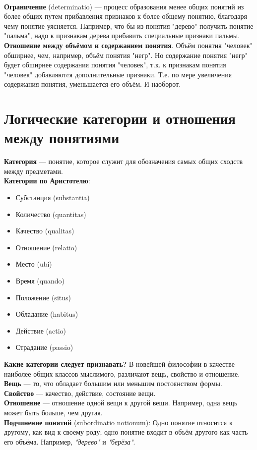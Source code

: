 \documentclass{article}
\begin{document}
\\
\textbf{Ограничение} (determinatio) --- процесс образования менее общих понятий из более общих путем прибавления признаков к более общему понятию, благодаря чему понятие уясняется. Например, что бы из понятия "дерево" получить понятие "пальма", надо к признакам дерева прибавить специальные признаки пальмы.
\\
\textbf{Отношение между объёмом и содержанием понятия}. Объём понятия "человек" обширнее, чем, например, объём понятия "негр". Но содержание понятия "негр" будет обширнее содержания понятия "человек", т.к. к признакам понятия "человек" добавляютcя дополнительные признаки. Т.е. по мере увеличения содержания понятия, уменьшается его объём. И наоборот.

\section{Логические категории и отношения между понятиями}
\textbf{Категория} --- понятие, которое служит для обозначения самых общих сходств между предметами.
\\
\textbf{Категории по Аристотелю}:
\begin{itemize}
\item Субстанция (substantia)
\item Количество (quantitas)
\item Качество (qualitas)
\item Отношение (relatio)
\item Место (ubi)
\item Время (quando)
\item Положение (situs)
\item Обладание (habitus)
\item Действие (actio)
\item Страдание (passio)
\end{itemize}
\textbf{Какие категории следует признавать?} В новейшей философии в качестве наиболее общих классов мыслимого, различают вещь, свойство и отношение.
\\
\textbf{Вещь} --- то, что обладает большим или меньшим постоянством формы.
\\
\textbf{Свойство} --- качество, действие, состояние вещи.
\\
\textbf{Отношение} --- отношение одной вещи к другой вещи. Например, одна вещь может быть больше, чем другая.
\\
\textbf{Подчинение понятий} (subordinatio notionum): Одно понятие относится к другому, как вид к своему роду; одно понятие входит в объём другого как часть его объёма. Например, \textit{"дерево"} и \textit{"берёза"}.
\end{document}
